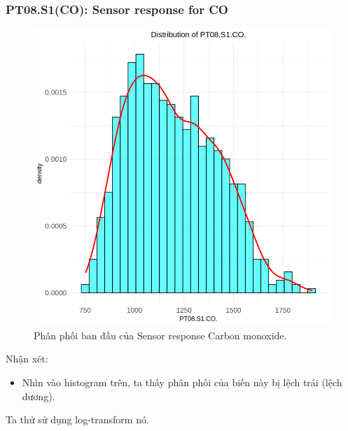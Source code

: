\subsubsection{PT08.S1(CO): Sensor response for CO}

\begin{figure}[H]
    \centering
    \includegraphics[width=0.75\columnwidth]{air_figures/PT08.S1(CO)_original_distribution.png}
    \caption{Phân phối ban đầu của Sensor response Carbon monoxide.}
    \label{fig:srco_original_distribution}
\end{figure}

Nhận xét:
\begin{itemize}
    \item Nhìn vào histogram trên, ta thấy phân phối của biến này bị lệch trái (lệch dương).
\end{itemize}

Ta thử sử dụng log-transform nó.


